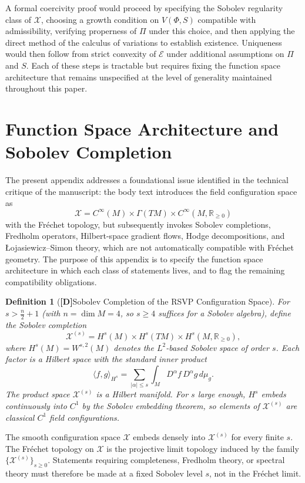 \documentclass[12pt,a4paper]{article}
\newcommand{\claimD}{\textbf{[D]}\;}
\newtheorem{defn}{Definition}[section]
\newcommand{\Field}{\mathcal{X}}
\begin{document}
A formal coercivity proof would proceed by specifying the Sobolev regularity
class of $\Field$, choosing a growth condition on $V(\Phi,S)$ compatible with
admissibility, verifying properness of $\Pi$ under this choice, and then
applying the direct method of the calculus of variations to establish existence.
Uniqueness would then follow from strict convexity of $\mathcal{E}$ under
additional assumptions on $\Pi$ and $S$. Each of these steps is tractable but
requires fixing the function space architecture that remains unspecified at the
level of generality maintained throughout this paper.

\section{Function Space Architecture and Sobolev Completion}

The present appendix addresses a foundational issue identified in the technical
critique of the manuscript: the body text introduces the field configuration
space as
\[
\Field = C^\infty(M)\times\Gamma(TM)\times C^\infty(M,\mathbb{R}_{\geq 0})
\]
with the Fr\'{e}chet topology, but subsequently invokes Sobolev completions,
Fredholm operators, Hilbert-space gradient flows, Hodge decompositions, and
Łojasiewicz--Simon theory, which are not automatically compatible with
Fr\'{e}chet geometry. The purpose of this appendix is to specify the function
space architecture in which each class of statements lives, and to flag the
remaining compatibility obligations.

\begin{defn}[\claimD Sobolev Completion of the RSVP Configuration Space]
For $s>\frac{n}{2}+1$ (with $n=\dim M=4$, so $s\geq 4$ suffices for a Sobolev
algebra), define the Sobolev completion
\[
\Field^{(s)}
= H^s(M)\times H^s(TM)\times H^s(M,\mathbb{R}_{\geq 0}),
\]
where $H^s(M)=W^{s,2}(M)$ denotes the $L^2$-based Sobolev space of
order $s$. Each factor is a Hilbert space with the standard inner product
\[
\langle f,g\rangle_{H^s}
= \sum_{|\alpha|\leq s}\int_M D^\alpha f\,D^\alpha g\,d\mu_g.
\]
The product space $\Field^{(s)}$ is a Hilbert manifold. For $s$ large enough,
$H^s$ embeds continuously into $C^1$ by the Sobolev embedding theorem, so
elements of $\Field^{(s)}$ are classical $C^1$ field configurations.
\end{defn}

The smooth configuration space $\Field$ embeds densely into $\Field^{(s)}$ for
every finite $s$. The Fr\'{e}chet topology on $\Field$ is the projective limit
topology induced by the family $\{\Field^{(s)}\}_{s\geq 0}$. Statements
requiring completeness, Fredholm theory, or spectral theory must therefore be
made at a fixed Sobolev level $s$, not in the Fr\'{e}chet limit.
\end{document}
